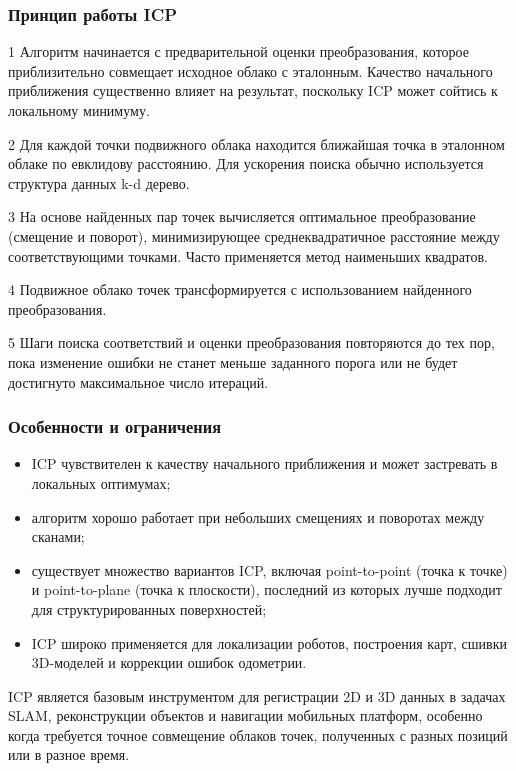 \subsubsection{Принцип работы ICP}

1 Алгоритм начинается с предварительной оценки преобразования, которое приблизительно совмещает исходное облако с эталонным. Качество начального приближения существенно влияет на результат, поскольку ICP может сойтись к локальному минимуму.
    
2 Для каждой точки подвижного облака находится ближайшая точка в эталонном облаке по евклидову расстоянию. Для ускорения поиска обычно используется структура данных k-d дерево.
    
3 На основе найденных пар точек вычисляется оптимальное преобразование (смещение и поворот), минимизирующее среднеквадратичное расстояние между соответствующими точками. Часто применяется метод наименьших квадратов.
    
4 Подвижное облако точек трансформируется с использованием найденного преобразования.
    
5 Шаги поиска соответствий и оценки преобразования повторяются до тех пор, пока изменение ошибки не станет меньше заданного порога или не будет достигнуто максимальное число итераций.

\subsubsection{Особенности и ограничения}
\begin{itemize}
	\item ICP чувствителен к качеству начального приближения и может застревать в локальных оптимумах;
	\item алгоритм хорошо работает при небольших смещениях и поворотах между сканами;
	\item существует множество вариантов ICP, включая point-to-point (точка к точке) и point-to-plane (точка к плоскости), последний из которых лучше подходит для структурированных поверхностей;
	\item ICP широко применяется для локализации роботов, построения карт, сшивки 3D-моделей и коррекции ошибок одометрии.
\end{itemize}

ICP является базовым инструментом для регистрации 2D и 3D данных в задачах SLAM, реконструкции объектов и навигации мобильных платформ, особенно когда требуется точное совмещение облаков точек, полученных с разных позиций или в разное время.

